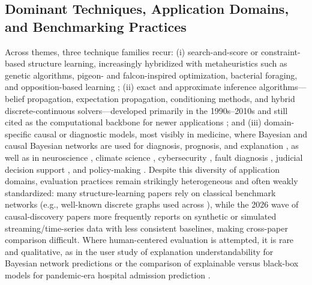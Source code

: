 \subsection{Dominant Techniques, Application Domains, and Benchmarking Practices}
Across themes, three technique families recur: (i) search-and-score or constraint-based structure learning, increasingly hybridized with metaheuristics such as genetic algorithms, pigeon- and falcon-inspired optimization, bacterial foraging, and opposition-based learning \cite{kareem2019pigeon,sun2022bayesian,sun2019hybrid,liu2022bayesian,awla2023comparative,kareem2021falcon,sun2025bayesian}; (ii) exact and approximate inference algorithms---belief propagation, expectation propagation, conditioning methods, and hybrid discrete-continuous solvers---developed primarily in the 1990s--2010s and still cited as the computational backbone for newer applications \cite{murphy2013loopy,minka2013expectation,darwiche2013conditioning,heskes2012expectation,salmeron2018review,gogate2012approximate,huang2013efficient,dagum1997optimal}; and (iii) domain-specific causal or diagnostic models, most visibly in medicine, where Bayesian and causal Bayesian networks are used for diagnosis, prognosis, and explanation \cite{zhang2026causald,zhang2026explainable,zhang2026bayesian,selvaraj2024artificial,polotskaya2024bayesian,ma2023bayesian,mclachlan2020bayesian,chen2020interpretable,rao2023medical,nicora2024bayesian}, as well as in neuroscience \cite{bielza2014bayesian}, climate science \cite{ebertuphoff2012causal}, cybersecurity \cite{zhang2017fuzzy,munozgonzalez2017efficient}, fault diagnosis \cite{chen2023fault}, judicial decision support \cite{moric2025based}, and policy-making \cite{moreira2025bayesian}. Despite this diversity of application domains, evaluation practices remain strikingly heterogeneous and often weakly standardized: many structure-learning papers rely on classical benchmark networks (e.g., well-known discrete graphs used across \cite{kitson2023survey,constantinou2021large,kitson2024impact,trosser2021improved}), while the 2026 wave of causal-discovery papers more frequently reports on synthetic or simulated streaming/time-series data with less consistent baselines, making cross-paper comparison difficult. Where human-centered evaluation is attempted, it is rare and qualitative, as in the user study of explanation understandability for Bayesian network predictions \cite{butz2022investigating} or the comparison of explainable versus black-box models for pandemic-era hospital admission prediction \cite{nicora2024bayesian}.

